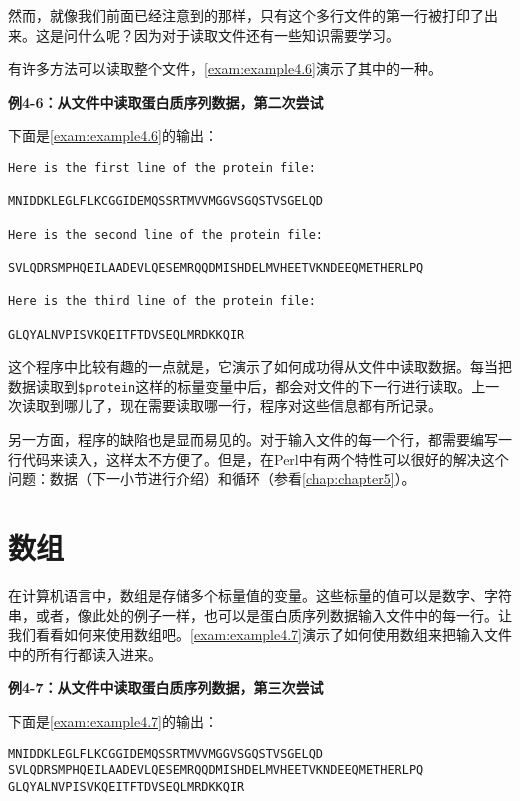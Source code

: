 然而，就像我们前面已经注意到的那样，只有这个多行文件的第一行被打印了出来。这是问什么呢？因为对于读取文件还有一些知识需要学习。

有许多方法可以读取整个文件，\autoref{exam:example4.6}演示了其中的一种。

\textbf{例4-6：从文件中读取蛋白质序列数据，第二次尝试}



下面是\autoref{exam:example4.6}的输出：

\begin{lstlisting}
Here is the first line of the protein file:

MNIDDKLEGLFLKCGGIDEMQSSRTMVVMGGVSGQSTVSGELQD

Here is the second line of the protein file:

SVLQDRSMPHQEILAADEVLQESEMRQQDMISHDELMVHEETVKNDEEQMETHERLPQ

Here is the third line of the protein file:

GLQYALNVPISVKQEITFTDVSEQLMRDKKQIR
\end{lstlisting}

这个程序中比较有趣的一点就是，它演示了如何成功得从文件中读取数据。每当把数据读取到\verb|$protein|这样的标量变量中后，都会对文件的下一行进行读取。上一次读取到哪儿了，现在需要读取哪一行，程序对这些信息都有所记录。

另一方面，程序的缺陷也是显而易见的。对于输入文件的每一个行，都需要编写一行代码来读入，这样太不方便了。但是，在Perl中有两个特性可以很好的解决这个问题：数据（下一小节进行介绍）和循环（参看\autoref{chap:chapter5}）。

\section{数组}
在计算机语言中，数组是存储多个标量值的变量。这些标量的值可以是数字、字符串，或者，像此处的例子一样，也可以是蛋白质序列数据输入文件中的每一行。让我们看看如何来使用数组吧。\autoref{exam:example4.7}演示了如何使用数组来把输入文件中的所有行都读入进来。

\textbf{例4-7：从文件中读取蛋白质序列数据，第三次尝试}



下面是\autoref{exam:example4.7}的输出：

\begin{lstlisting}
MNIDDKLEGLFLKCGGIDEMQSSRTMVVMGGVSGQSTVSGELQD
SVLQDRSMPHQEILAADEVLQESEMRQQDMISHDELMVHEETVKNDEEQMETHERLPQ
GLQYALNVPISVKQEITFTDVSEQLMRDKKQIR
\end{lstlisting}

